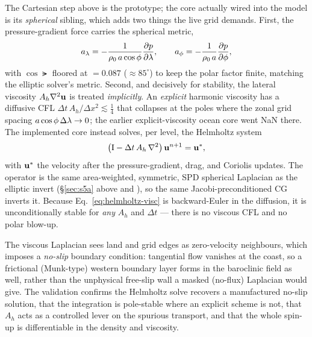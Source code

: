 The Cartesian step above is the prototype; the core actually wired into the model is its
\emph{spherical} sibling, which adds two things the live grid demands. First, the
pressure-gradient force carries the spherical metric,
\begin{equation}\label{eq:pgf-sphere}
  a_\lambda=-\frac{1}{\rho_0\,a\cos\phi}\frac{\partial p}{\partial \lambda},\qquad
  a_\phi=-\frac{1}{\rho_0\,a}\frac{\partial p}{\partial \phi},
\end{equation}
with $\cos\lat$ floored at $=0.087$ ($\approx85^\circ$) to keep the polar
factor finite, matching the elliptic solver's metric. Second, and decisively for stability, the
lateral viscosity $A_h\nabla^{2}\mathbf{u}$ is treated \emph{implicitly}. An \emph{explicit} harmonic
viscosity has a diffusive CFL $\Delta t\,A_h/\Delta x^2\lesssim\tfrac14$ that collapses at the
poles where the zonal grid spacing $a\cos\phi\,\Delta\lambda\to0$; the earlier explicit-viscosity
ocean core went NaN there. The implemented core instead solves, per level, the Helmholtz system
\begin{equation}\label{eq:helmholtz-visc}
  \big(\mathrm I-\Delta t\,A_h\,\nabla^{2}\big)\,\mathbf{u}^{n+1}=\mathbf{u}^{*},
\end{equation}
with $\mathbf{u}^{*}$ the velocity after the pressure-gradient, drag, and Coriolis updates. The
operator is the same area-weighted, symmetric, SPD spherical Laplacian as the elliptic invert
(\S\ref{sec:s5a} above and ), so the same Jacobi-preconditioned CG inverts it.
Because Eq.~\eqref{eq:helmholtz-visc} is backward-Euler in the diffusion, it is unconditionally
stable for \emph{any} $A_h$ and $\Delta t$ --- there is no viscous CFL and no polar blow-up.

The viscous Laplacian sees land and grid edges as zero-velocity neighbours, which imposes a
\emph{no-slip} boundary condition: tangential flow vanishes at the coast, so a frictional
(Munk-type) western boundary layer forms in the baroclinic field as well, rather than the
unphysical free-slip wall a masked (no-flux) Laplacian would give. The validation confirms the
Helmholtz solve recovers a manufactured no-slip solution, that the integration is pole-stable
where an explicit scheme is not, that $A_h$ acts as a controlled lever on the spurious transport,
and that the whole spin-up is differentiable in the density and viscosity.

